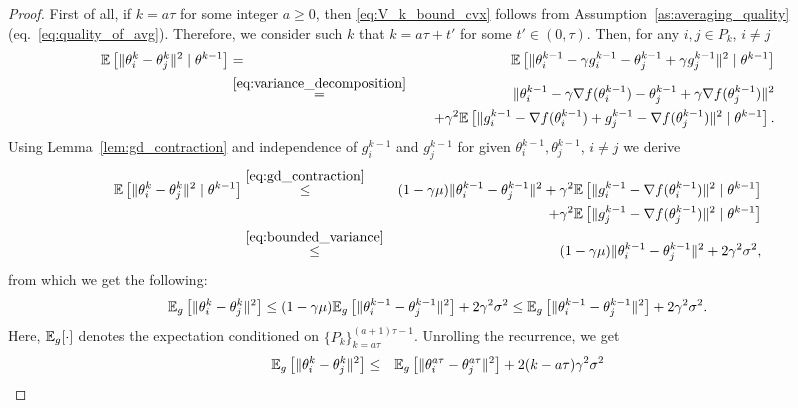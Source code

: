 \begin{proof}
    First of all, if $k = a\tau$ for some integer $a\ge 0$, then \eqref{eq:V_k_bound_cvx} follows from Assumption~\ref{as:averaging_quality} (eq.~\eqref{eq:quality_of_avg}). Therefore, we consider such $k$ that $k = a\tau + t'$ for some $t'\in (0,\tau)$. Then, for any $i,j \in P_{k}$, $i\neq j$
    \begin{eqnarray*}
        \mathbb{E}\left[\|\theta_i^k - \theta_j^k\|^2\mid \theta^{k-1}\right] &=& \mathbb{E}\left[\|\theta_i^{k-1} - \gamma g_i^{k-1} - \theta_j^{k-1} + \gamma g_{j}^{k-1}\|^2\mid \theta^{k-1}\right]\\
        &\overset{\eqref{eq:variance_decomposition}}{=}& \|\theta_i^{k-1} - \gamma \nabla f(\theta_i^{k-1}) - \theta_j^{k-1} + \gamma \nabla f(\theta_j^{k-1})\|^2\\
        &&\quad +\gamma^2\mathbb{E}\left[\|g_i^{k-1} - \nabla f(\theta_i^{k-1}) + g_{j}^{k-1} - \nabla f(\theta_j^{k-1})\|^2\mid \theta^{k-1}\right].
    \end{eqnarray*}
    Using Lemma~\ref{lem:gd_contraction} and independence of $g_i^{k-1}$ and $g_j^{k-1}$ for given $\theta_i^{k-1}, \theta_j^{k-1}$, $i\neq j$ we derive
    \begin{eqnarray*}
        \mathbb{E}\left[\|\theta_i^k - \theta_j^k\|^2\mid \theta^{k-1}\right] &\overset{\eqref{eq:gd_contraction}}{\le}& (1-\gamma\mu)\|\theta_i^{k-1} - \theta_j^{k-1}\|^2 +\gamma^2\mathbb{E}\left[\|g_i^{k-1} - \nabla f(\theta_i^{k-1})\|^2\mid \theta^{k-1}\right]\\
        &&\quad +\gamma^2\mathbb{E}\left[\|g_j^{k-1} - \nabla f(\theta_j^{k-1})\|^2\mid \theta^{k-1}\right]\\
        &\overset{\eqref{eq:bounded_variance}}{\le}& (1-\gamma\mu)\|\theta_i^{k-1} - \theta_j^{k-1}\|^2 + 2\gamma^2\sigma^2,
    \end{eqnarray*}
    from which we get the following: 
    \begin{equation}
        \EE_g\left[\|\theta_i^k - \theta_j^k\|^2\right] \le (1-\gamma\mu)\EE_g\left[\|\theta_i^{k-1} - \theta_j^{k-1}\|^2\right] + 2\gamma^2\sigma^2 \le \EE_g\left[\|\theta_i^{k-1} - \theta_j^{k-1}\|^2\right] + 2\gamma^2\sigma^2.\notag %
    \end{equation}
    Here, $\mathbb{E}_g[\cdot]$ denotes the expectation conditioned on $\{P_k\}_{k = a\tau}^{(a+1)\tau-1}$. Unrolling the recurrence, we get
    \begin{eqnarray}
        \EE_g\left[\|\theta_i^k - \theta_j^k\|^2\right] &\le& \EE_g\left[\|\theta_i^{a\tau} - \theta_j^{a\tau}\|^2\right] + 2(k-a\tau)\gamma^2\sigma^2\notag \\

\end{eqnarray}
\end{proof}
